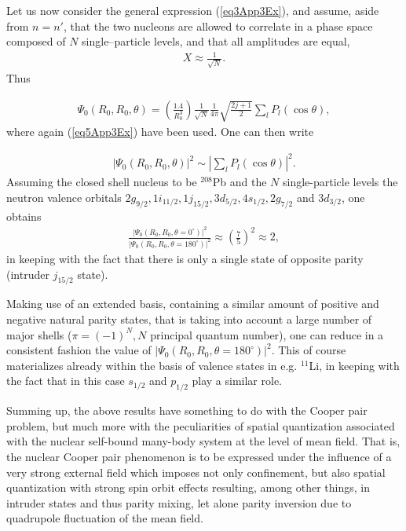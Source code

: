 Let us now consider the general expression (\ref{eq3App3Ex}), and assume, aside from $n=n'$, that  the two nucleons are allowed to correlate in a phase space composed of $N$ single--particle levels, and that all amplitudes are equal,
\begin{align}\label{eq8App3E}
X\approx\frac{1}{\sqrt{N}}.
\end{align}
Thus 

\begin{align}\label{eq9App3E}
\Psi_0(R_0,R_0,\theta)
=\left(\frac{1.4}{R_0^3}\right)\frac{1}{\sqrt{N}}\frac{1}{4\pi}\sqrt{\frac{2j+1}{2}}\sum_lP_l(\cos\theta),
\end{align}
where again (\ref{eq5App3Ex}) have been used. One can then  write 

\begin{align}\label{eq10App3E}
|\Psi_0(R_0,R_0,\theta)|^2\sim |\sum_lP_l(\cos\theta)|^2.
\end{align}
Assuming the closed shell nucleus to be $^{208}$Pb and  the $N$ single-particle levels  the neutron valence orbitals $2g_{9/2},1i_{11/2},1j_{15/2},3d_{5/2},4s_{1/2},2g_{7/2}$ and $3d_{3/2}$, one obtains
\begin{align}\label{eq11App3E}
\frac{|\Psi_0(R_0,R_0,\theta=0^\circ)|^2}{|\Psi_0(R_0,R_0,\theta=180^\circ)|^2}\approx\left(\frac{7}{5}\right)^2\approx2,
\end{align}
in keeping with the fact that there is only a single state of opposite parity (intruder $j_{15/2}$ state).

Making use of an extended basis, containing a similar amount of positive and negative natural parity states, that is taking into account a large number of major shells ($\pi=(-1)^N, N$ principal quantum number), one can reduce in a consistent fashion the value of $|\Psi_0(R_0,R_0,\theta=180^\circ)|^2$.
This of course materializes already within the basis of valence states in e.g. $^{11}$Li, in keeping with the fact that in this case $s_{1/2}$ and $p_{1/2}$ play a similar role. 


Summing up, the above results have something to do with the Cooper pair problem, but much more with the peculiarities of spatial quantization associated with the nuclear self-bound many-body system at the level of mean field. That is, the nuclear Cooper pair phenomenon  is to be expressed under the influence of a very strong external field which imposes not only confinement, but also spatial quantization with strong spin orbit effects resulting, among other things, in intruder states and thus parity mixing, let alone parity inversion due to quadrupole fluctuation of the mean field.   

